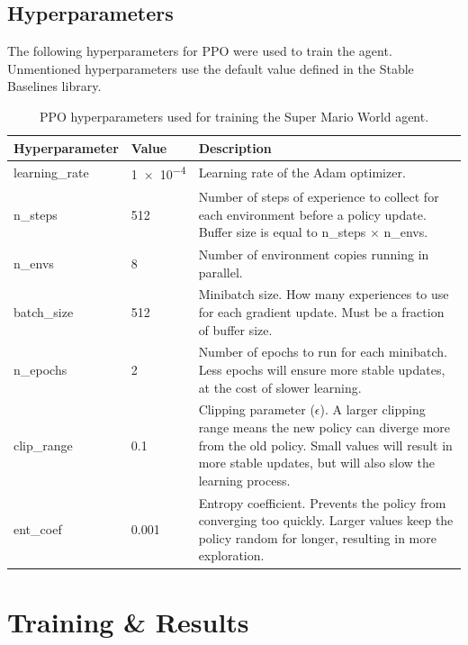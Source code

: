\documentclass[a4paper]{article}
\begin{document}
\subsection{Hyperparameters}
The following hyperparameters for PPO were used to train the agent.
Unmentioned hyperparameters use the default value defined in the Stable Baselines library.
\begin{table}[htbp]
\centering
\begin{tabularx}{\linewidth}{llX}
\toprule
Hyperparameter & Value & Description \tabularnewline
\midrule
learning\_rate & \num{1e-4} & Learning rate of the Adam optimizer. \tabularnewline
n\_steps & 512 & Number of steps of experience to collect for each environment before a policy update. Buffer size is equal to n\_steps $\times$ n\_envs. \tabularnewline
n\_envs & 8 & Number of environment copies running in parallel. \tabularnewline
batch\_size & 512 & Minibatch size. How many experiences to use for each gradient update. Must be a fraction of buffer size. \tabularnewline
n\_epochs & 2 & Number of epochs to run for each minibatch. Less epochs will ensure more stable updates, at the cost of slower learning. \tabularnewline
clip\_range & 0.1 & Clipping parameter ($\epsilon$). A larger clipping range means the new policy can diverge more from the old policy. Small values will result in more stable updates, but will also slow the learning process. \tabularnewline
ent\_coef & 0.001 & Entropy coefficient. Prevents the policy from converging too quickly. Larger values keep the policy random for longer, resulting in more exploration. \tabularnewline
\bottomrule
\end{tabularx}
\caption{PPO hyperparameters used for training the Super Mario World agent.}
\label{table:hyperparams}
\end{table}

\section{Training \& Results} \label{s:training-results}
\end{document}
